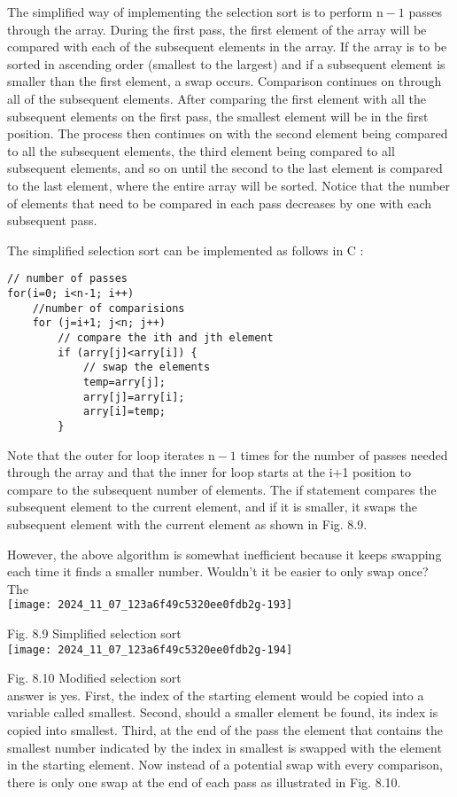 \documentclass[10pt]{article}
\begin{document}
The simplified way of implementing the selection sort is to perform $\mathrm{n}-1$ passes through the array. During the first pass, the first element of the array will be compared with each of the subsequent elements in the array. If the array is to be\\
sorted in ascending order (smallest to the largest) and if a subsequent element is smaller than the first element, a swap occurs. Comparison continues on through all of the subsequent elements. After comparing the first element with all the subsequent elements on the first pass, the smallest element will be in the first position. The process then continues on with the second element being compared to all the subsequent elements, the third element being compared to all subsequent elements, and so on until the second to the last element is compared to the last element, where the entire array will be sorted. Notice that the number of elements that need to be compared in each pass decreases by one with each subsequent pass.

The simplified selection sort can be implemented as follows in C :

\begin{verbatim}
// number of passes
for(i=0; i<n-1; i++)
    //number of comparisions
    for (j=i+1; j<n; j++)
        // compare the ith and jth element
        if (arry[j]<arry[i]) {
            // swap the elements
            temp=arry[j];
            arry[j]=arry[i];
            arry[i]=temp;
        }
\end{verbatim}

Note that the outer for loop iterates $\mathrm{n}-1$ times for the number of passes needed through the array and that the inner for loop starts at the i+1 position to compare to the subsequent number of elements. The if statement compares the subsequent element to the current element, and if it is smaller, it swaps the subsequent element with the current element as shown in Fig. 8.9.

However, the above algorithm is somewhat inefficient because it keeps swapping each time it finds a smaller number. Wouldn't it be easier to only swap once? The\\
\texttt{[image: 2024\_11\_07\_123a6f49c5320ee0fdb2g-193]}

Fig. 8.9 Simplified selection sort\\
\texttt{[image: 2024\_11\_07\_123a6f49c5320ee0fdb2g-194]}

Fig. 8.10 Modified selection sort\\
answer is yes. First, the index of the starting element would be copied into a variable called smallest. Second, should a smaller element be found, its index is copied into smallest. Third, at the end of the pass the element that contains the smallest number indicated by the index in smallest is swapped with the element in the starting element. Now instead of a potential swap with every comparison, there is only one swap at the end of each pass as illustrated in Fig. 8.10.
\end{document}
